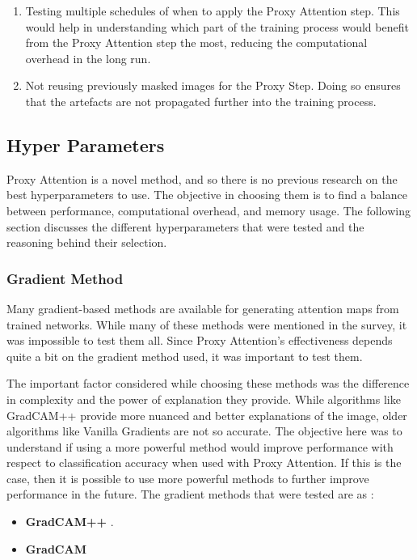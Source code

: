 \begin{enumerate}
    \item Testing multiple schedules of when to apply the Proxy Attention step. This would help in understanding which part of the training process would benefit from the Proxy Attention step the most, reducing the computational overhead in the long run.
    \item Not reusing previously masked images for the Proxy Step. Doing so ensures that the artefacts are not propagated further into the training process.
\end{enumerate}

\subsubsection{}

\subsection{Hyper Parameters} \label{sec:hyperparameters}
Proxy Attention is a novel method, and so there is no previous research on the best hyperparameters to use. The objective in choosing them is to find a balance between performance, computational overhead, and memory usage. The following section discusses the different hyperparameters that were tested and the reasoning behind their selection.

\subsubsection{Gradient Method}
Many gradient-based methods are available for generating attention maps from trained networks. While many of these methods were mentioned in the survey, it was impossible to test them all. Since Proxy Attention's effectiveness depends quite a bit on the gradient method used, it was important to test them.

The important factor considered while choosing these methods was the difference in complexity and the power of explanation they provide. While algorithms like GradCAM++ \cite{chattopadhayGradCAMGeneralizedGradientBased2018} provide more nuanced and better explanations of the image, older algorithms like Vanilla Gradients \cite{zeilerVisualizingUnderstandingConvolutional2013} are not so accurate. The objective here was to understand if using a more powerful method would improve performance with respect to classification accuracy when used with Proxy Attention. If this is the case, then it is possible to use more powerful methods to further improve performance in the future.
The gradient methods that were tested are as :
\begin{itemize}
    \item \textbf{GradCAM++} \cite{chattopadhayGradCAMGeneralizedGradientBased2018}.
    \item \textbf{GradCAM} \cite{selvarajuGradCAMVisualExplanations}
\end{itemize}

